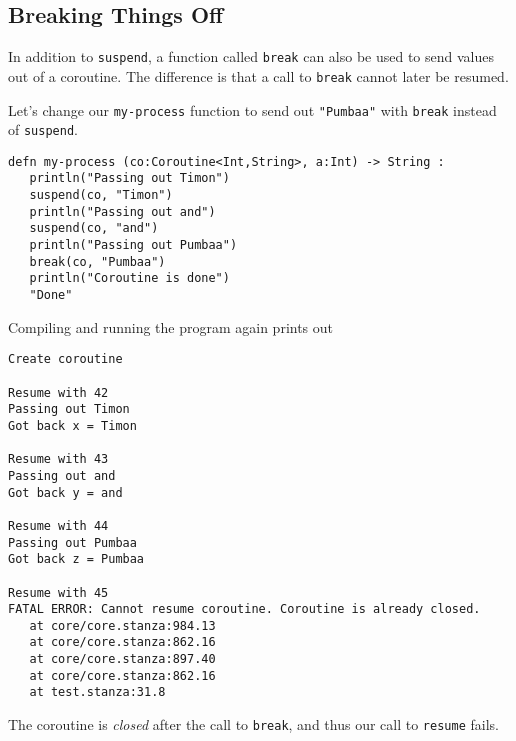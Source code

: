 \documentclass[10pt,oneside]{book}
\begin{document}
\subsection*{Breaking Things Off}
In addition to \texttt{\frenchspacing suspend}, a function called \texttt{\frenchspacing break} can also be used to send values out of a coroutine. The difference is that a call to \texttt{\frenchspacing break} cannot later be resumed.

Let's change our \texttt{\frenchspacing my-process} function to send out \texttt{\frenchspacing "Pumbaa"} with \texttt{\frenchspacing break} instead of \texttt{\frenchspacing suspend}.
\begin{lstlisting}
defn my-process (co:Coroutine<Int,String>, a:Int) -> String :
   println("Passing out Timon")
   suspend(co, "Timon")
   println("Passing out and")
   suspend(co, "and")
   println("Passing out Pumbaa")
   break(co, "Pumbaa")
   println("Coroutine is done")
   "Done"
\end{lstlisting}

Compiling and running the program again prints out
\begin{lstlisting}
Create coroutine

Resume with 42
Passing out Timon
Got back x = Timon

Resume with 43
Passing out and
Got back y = and

Resume with 44
Passing out Pumbaa
Got back z = Pumbaa

Resume with 45
FATAL ERROR: Cannot resume coroutine. Coroutine is already closed.
   at core/core.stanza:984.13
   at core/core.stanza:862.16
   at core/core.stanza:897.40
   at core/core.stanza:862.16
   at test.stanza:31.8
\end{lstlisting}
The coroutine is {\em closed} after the call to \texttt{\frenchspacing break}, and thus our call to \texttt{\frenchspacing resume} fails.
\end{document}
